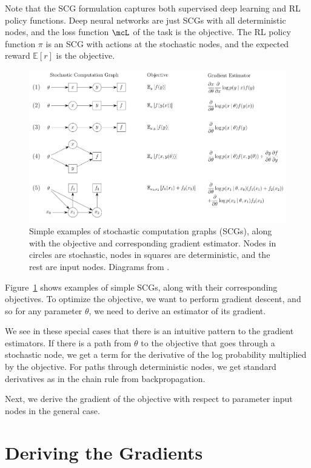 \documentclass[12pt]{report}
\begin{document}
Note that the SCG formulation captures both supervised deep learning and RL policy functions. Deep neural networks are just SCGs with all deterministic nodes, and the loss function $\mcL$ of the task is the objective. The RL policy function $\pi$ is an SCG with actions at the stochastic nodes, and the expected reward $\mathbb{E}[r]$ is the objective.

\begin{figure}[t]
\includegraphics[width=\textwidth]{images/SCGs}
\caption[Stochastic Computation Graphs]{Simple examples of stochastic computation graphs (SCGs), along with the objective and corresponding gradient estimator. Nodes in circles are stochastic, nodes in squares are deterministic, and the rest are input nodes. Diagrams from \citet{schulman2015backprop}.}
\label{fig:scg}
\end{figure}

Figure~\ref{fig:scg} shows examples of simple SCGs, along with their corresponding objectives. To optimize the objective, we want to perform gradient descent, and so for any parameter $\theta$, we need to derive an estimator of its gradient.

We see in these special cases that there is an intuitive pattern to the gradient estimators. If there is a path from $\theta$ to the objective that goes through a stochastic node, we get a term for the derivative of the log probability multiplied by the objective. For paths through deterministic nodes, we get standard derivatives as in the chain rule from backpropagation.

Next, we derive the gradient of the objective with respect to parameter input nodes in the general case.

\section{Deriving the Gradients}
\end{document}
